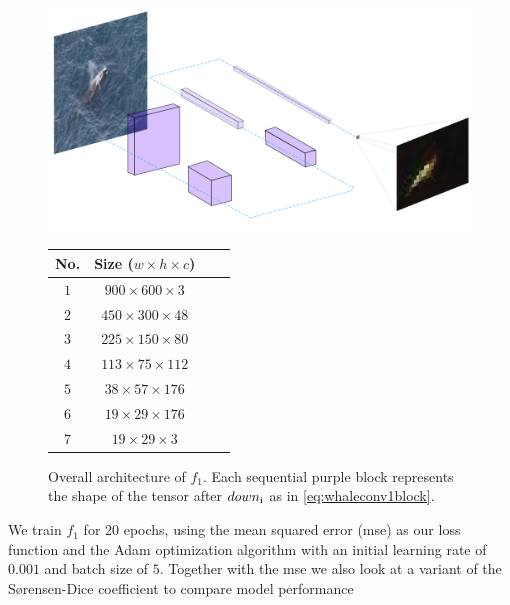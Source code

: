 \documentclass{IET}%
\begin{document}
\begin{figure}
\centering
\begin{minipage}[t]{.7\textwidth}
\centering
\vspace{0pt}
\centering
\includegraphics[width=\textwidth]{images/fcn/deconv2.png}
\label{fig:nn}
\caption{Overall architecture of $f_1$. Each sequential purple block represents the shape of the tensor after $down\textsubscript{i}$ as in \ref{eq:whaleconv1block}.}
\end{minipage}\hfill
\begin{minipage}[t]{.3\textwidth}
\centering
\vspace{40pt}
\begin{tabular}{cc|cc}
  No. & Size ($w\times h\times c$) &\\
    \hline
    \hline
    $1$ & $900 \times 600 \times 3$  & \\
    $2$ & $450 \times 300 \times 48$ &  \\
    $3$ & $225 \times 150 \times 80$ & \\ 
    $4$ & $113 \times 75 \times 112$ &\\
    $5$ & $38 \times 57 \times 176$ &\\
    $6$ &  $19 \times 29 \times 176$ &\\
    $7$ &  $19 \times 29 \times 3$ &\\
\end{tabular}
\end{minipage}
\end{figure}
We train $f_1$ for 20 epochs, using the mean squared error (mse) as our loss function and the Adam optimization algorithm with an initial learning rate of $0.001$ and batch size of $5$. Together with the mse we also look at a variant of the S{\o}rensen-Dice coefficient to compare model performance \cite{sorensen1948method}
\end{document}
